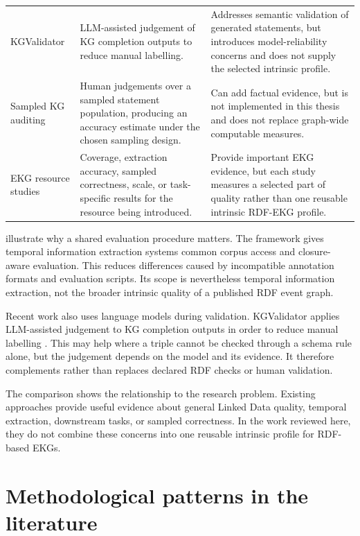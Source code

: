\begin{longtable}{>{\raggedright\arraybackslash}p{3.0cm}>{\raggedright\arraybackslash}p{5.3cm}>{\raggedright\arraybackslash}p{5.7cm}}
KGValidator \citep{kgvalidator2024} & LLM-assisted judgement of KG completion outputs to reduce manual labelling. & Addresses semantic validation of generated statements, but introduces model-reliability concerns and does not supply the selected intrinsic profile. \\
Sampled KG auditing \citep{efficienteval2019} & Human judgements over a sampled statement population, producing an accuracy estimate under the chosen sampling design. & Can add factual evidence, but is not implemented in this thesis and does not replace graph-wide computable measures. \\
EKG resource studies \citep{eventkg2018,newsreader2016,aser2019} & Coverage, extraction accuracy, sampled correctness, scale, or task-specific results for the resource being introduced. & Provide important EKG evidence, but each study measures a selected part of quality rather than one reusable intrinsic RDF-EKG profile. \\
\bottomrule
\end{longtable}

\citet{tieval2023} illustrate why a shared evaluation procedure matters. The framework gives temporal information extraction systems common corpus access and closure-aware evaluation. This reduces differences caused by incompatible annotation formats and evaluation scripts. Its scope is nevertheless temporal information extraction, not the broader intrinsic quality of a published RDF event graph.

Recent work also uses language models during validation. KGValidator applies LLM-assisted judgement to KG completion outputs in order to reduce manual labelling \citep{kgvalidator2024}. This may help where a triple cannot be checked through a schema rule alone, but the judgement depends on the model and its evidence. It therefore complements rather than replaces declared RDF checks or human validation.

The comparison shows the relationship to the research problem. Existing approaches provide useful evidence about general Linked Data quality, temporal extraction, downstream tasks, or sampled correctness. In the work reviewed here, they do not combine these concerns into one reusable intrinsic profile for RDF-based EKGs.

\section{Methodological patterns in the literature}

